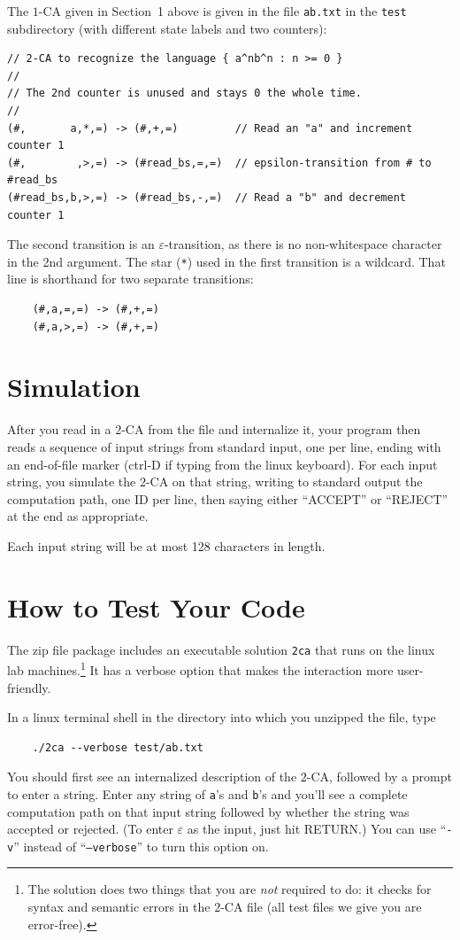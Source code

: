 \documentclass[11pt]{article}
\newcommand{\emptystr}{\varepsilon}
\renewcommand{\t}[1]{\texttt{#1}}
\theoremstyle{definition}
\begin{document}
The $1$-CA given in Section~1 above is given in the file \t{ab.txt} in the \t{test} subdirectory (with different state labels and two counters):
\begin{verbatim}
// 2-CA to recognize the language { a^nb^n : n >= 0 }
//
// The 2nd counter is unused and stays 0 the whole time.
//
(#,       a,*,=) -> (#,+,=)         // Read an "a" and increment counter 1
(#,        ,>,=) -> (#read_bs,=,=)  // epsilon-transition from # to #read_bs
(#read_bs,b,>,=) -> (#read_bs,-,=)  // Read a "b" and decrement counter 1
\end{verbatim}
The second transition is an $\emptystr$-transition, as there is no non-whitespace character in the 2nd argument.  The star (\t{*}) used in the first transition is a wildcard.  That line is shorthand for two separate transitions:
\begin{verbatim}
    (#,a,=,=) -> (#,+,=)
    (#,a,>,=) -> (#,+,=)
\end{verbatim}

\section{Simulation}

After you read in a $2$-CA from the file and internalize it, your program then reads a sequence of input strings from standard input, one per line, ending with an end-of-file marker (ctrl-D if typing from the linux keyboard).  For each input string, you simulate the $2$-CA on that string, writing to standard output the computation path, one ID per line, then saying either ``ACCEPT'' or ``REJECT'' at the end as appropriate.

Each input string will be at most 128 characters in length.

\section{How to Test Your Code}

The zip file package includes an executable solution \t{2ca} that runs on the linux lab machines.\footnote{The solution does two things that you are \emph{not} required to do: it checks for syntax and semantic errors in the $2$-CA file (all test files we give you are error-free).}  It has a verbose option that makes the interaction more user-friendly.

In a linux terminal shell in the directory into which you unzipped the file, type
\begin{verbatim}
    ./2ca --verbose test/ab.txt
\end{verbatim}
You should first see an internalized description of the $2$-CA, followed by a prompt to enter a string.  Enter any string of \t a's and \t b's and you'll see a complete computation path on that input string followed by whether the string was accepted or rejected.  (To enter $\emptystr$ as the input, just hit RETURN.)  You can use ``\t{-v}'' instead of ``\t{--verbose}'' to turn this option on.
\end{document}
